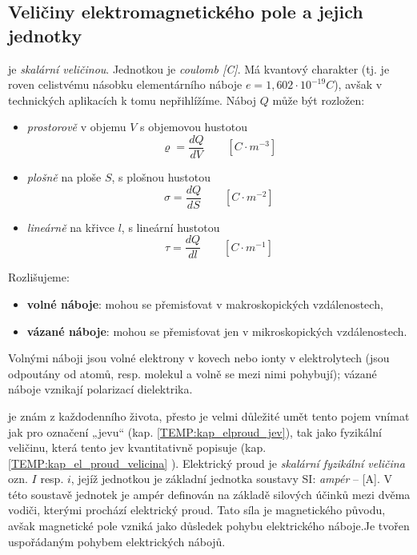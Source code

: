     \subsection{Veličiny elektromagnetického pole a jejich jednotky}
       je \emph{skalární veličinou}. Jednotkou je \emph{coulomb [C]}. Má
         kvantový charakter (tj. je roven celistvému násobku elementárního náboje $e =
         1,602\cdot10^{-19}C$), avšak v technických aplikacích k tomu nepřihlížíme. Náboj $Q$
         může být rozložen:
         \begin{itemize}
            \item \emph{prostorově} v objemu $V$ s objemovou hustotou
               \begin{equation}\label{TEMP:eq_q_varrho}
                  \varrho = \frac{dQ}{dV} \qquad [C\cdot m^{-3}]
               \end{equation}               
            \item \emph{plošně} na ploše $S$, s plošnou hustotou
               \begin{equation}\label{TEMP:eq_q_sigma}
                  \sigma = \frac{dQ}{dS} \qquad [C\cdot m^{-2}]
               \end{equation}                 
            \item \emph{lineárně} na křivce $l$, s lineární hustotou
               \begin{equation}\label{TEMP:eq_q_tau}
                  \tau = \frac{dQ}{dl} \qquad [C\cdot m^{-1}]
               \end{equation}                 
         \end{itemize}
         Rozlišujeme:
           \begin{itemize}
             \item \textbf{volné náboje}: mohou se přemisťovat v makroskopických
             vzdálenostech,
             \item \textbf{vázané náboje}: mohou se přemisťovat jen v
             mikroskopických vzdálenostech.
           \end{itemize}
         Volnými náboji jsou volné elektrony v kovech nebo ionty v elektrolytech (jsou odpoutány od
         atomů, resp. molekul a volně se mezi nimi pohybují); vázané náboje vznikají polarizací
         dielektrika.
         
      \label{TEMP:kap_el_proud_velicina} je znám z každodenního života,
        přesto je velmi důležité umět tento pojem vnímat jak pro označení „jevu“ (kap.
        \ref{TEMP:kap_elproud_jev}), tak jako fyzikální veličinu, která tento jev kvantitativně
        popisuje (kap. \ref{TEMP:kap_el_proud_velicina} ). Elektrický proud je \emph{skalární
        fyzikální veličina} ozn. $I$ resp. $i$, jejíž jednotkou je základní jednotka soustavy SI:
        \emph{ampér} – [A]. V této soustavě jednotek je ampér definován na základě silových
        účinků mezi dvěma vodiči, kterými prochází elektrický proud. Tato síla je magnetického
        původu, avšak magnetické pole vzniká jako důsledek pohybu elektrického náboje.Je tvořen
        uspořádaným pohybem elektrických nábojů.
        
